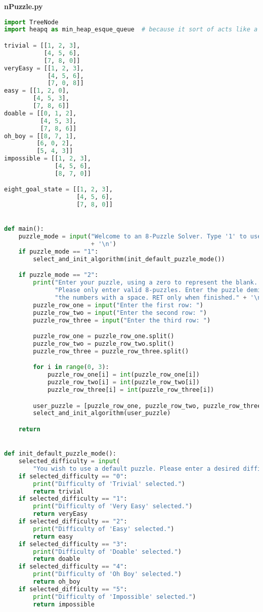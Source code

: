 \documentclass{article}
\begin{document}
\textbf{nPuzzle.py}
\begin{lstlisting}[language=python]
import TreeNode
import heapq as min_heap_esque_queue  # because it sort of acts like a min heap

trivial = [[1, 2, 3],
           [4, 5, 6],
           [7, 8, 0]]
veryEasy = [[1, 2, 3],
            [4, 5, 6],
            [7, 0, 8]]
easy = [[1, 2, 0],
        [4, 5, 3],
        [7, 8, 6]]
doable = [[0, 1, 2],
          [4, 5, 3],
          [7, 8, 6]]
oh_boy = [[8, 7, 1],
         [6, 0, 2],
         [5, 4, 3]]
impossible = [[1, 2, 3],
              [4, 5, 6],
              [8, 7, 0]]

eight_goal_state = [[1, 2, 3],
                    [4, 5, 6],
                    [7, 8, 0]]


def main():
    puzzle_mode = input("Welcome to an 8-Puzzle Solver. Type '1' to use a default puzzle, or '2' to create your own."
                        + '\n')
    if puzzle_mode == "1":
        select_and_init_algorithm(init_default_puzzle_mode())

    if puzzle_mode == "2":
        print("Enter your puzzle, using a zero to represent the blank. " +
              "Please only enter valid 8-puzzles. Enter the puzzle demilimiting " +
              "the numbers with a space. RET only when finished." + '\n')
        puzzle_row_one = input("Enter the first row: ")
        puzzle_row_two = input("Enter the second row: ")
        puzzle_row_three = input("Enter the third row: ")

        puzzle_row_one = puzzle_row_one.split()
        puzzle_row_two = puzzle_row_two.split()
        puzzle_row_three = puzzle_row_three.split()

        for i in range(0, 3):
            puzzle_row_one[i] = int(puzzle_row_one[i])
            puzzle_row_two[i] = int(puzzle_row_two[i])
            puzzle_row_three[i] = int(puzzle_row_three[i])

        user_puzzle = [puzzle_row_one, puzzle_row_two, puzzle_row_three]
        select_and_init_algorithm(user_puzzle)

    return


def init_default_puzzle_mode():
    selected_difficulty = input(
        "You wish to use a default puzzle. Please enter a desired difficulty on a scale from 0 to 5." + '\n')
    if selected_difficulty == "0":
        print("Difficulty of 'Trivial' selected.")
        return trivial
    if selected_difficulty == "1":
        print("Difficulty of 'Very Easy' selected.")
        return veryEasy
    if selected_difficulty == "2":
        print("Difficulty of 'Easy' selected.")
        return easy
    if selected_difficulty == "3":
        print("Difficulty of 'Doable' selected.")
        return doable
    if selected_difficulty == "4":
        print("Difficulty of 'Oh Boy' selected.")
        return oh_boy
    if selected_difficulty == "5":
        print("Difficulty of 'Impossible' selected.")
        return impossible



\end{lstlisting}
\end{document}
